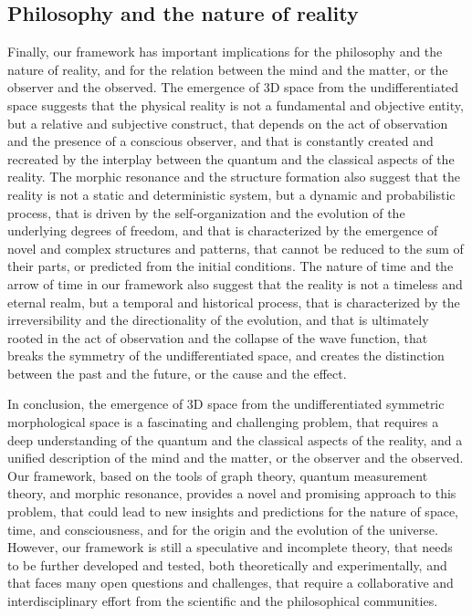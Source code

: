 \subsection{Philosophy and the nature of reality}
Finally, our framework has important implications for the philosophy and the nature of reality, and for the relation between the mind and the matter, or the observer and the observed. The emergence of 3D space from the undifferentiated space suggests that the physical reality is not a fundamental and objective entity, but a relative and subjective construct, that depends on the act of observation and the presence of a conscious observer, and that is constantly created and recreated by the interplay between the quantum and the classical aspects of the reality. The morphic resonance and the structure formation also suggest that the reality is not a static and deterministic system, but a dynamic and probabilistic process, that is driven by the self-organization and the evolution of the underlying degrees of freedom, and that is characterized by the emergence of novel and complex structures and patterns, that cannot be reduced to the sum of their parts, or predicted from the initial conditions. The nature of time and the arrow of time in our framework also suggest that the reality is not a timeless and eternal realm, but a temporal and historical process, that is characterized by the irreversibility and the directionality of the evolution, and that is ultimately rooted in the act of observation and the collapse of the wave function, that breaks the symmetry of the undifferentiated space, and creates the distinction between the past and the future, or the cause and the effect.

In conclusion, the emergence of 3D space from the undifferentiated symmetric morphological space is a fascinating and challenging problem, that requires a deep understanding of the quantum and the classical aspects of the reality, and a unified description of the mind and the matter, or the observer and the observed. Our framework, based on the tools of graph theory, quantum measurement theory, and morphic resonance, provides a novel and promising approach to this problem, that could lead to new insights and predictions for the nature of space, time, and consciousness, and for the origin and the evolution of the universe. However, our framework is still a speculative and incomplete theory, that needs to be further developed and tested, both theoretically and experimentally, and that faces many open questions and challenges, that require a collaborative and interdisciplinary effort from the scientific and the philosophical communities.

